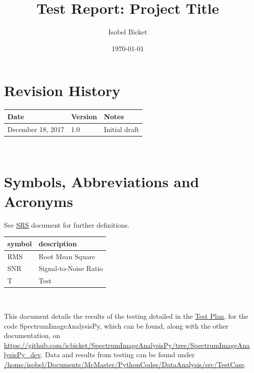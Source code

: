 \documentclass[12pt, titlepage]{article}
\newcommand{\progname}{SpectrumImageAnalysisPy}
\begin{document}
\title{Test Report: Project Title} 
\author{Isobel Bicket}
\date{\today}
	
\maketitle


\section{Revision History}

\begin{tabularx}{\textwidth}{p{4cm}p{2cm}X}
\toprule {\bf Date} & {\bf Version} & {\bf Notes}\\
\midrule
December 18, 2017 & 1.0 & Initial draft\\
\bottomrule
\end{tabularx}

~\newpage

\section{Symbols, Abbreviations and Acronyms}
See \hyperref[Doc:SRS]{SRS} document for further definitions.\\

\renewcommand{\arraystretch}{1.2}
\begin{tabular}{l l} 
  \toprule		
  \textbf{symbol} & \textbf{description}\\
  \midrule 
  RMS & Root Mean Square\\
  SNR & Signal-to-Noise Ratio\\
  T & Test\\
  \bottomrule
\end{tabular}\\


\newpage

\tableofcontents

\listoftables %

\listoffigures %

\newpage


This document details the results of the testing detailed in the
\hyperref[Doc:TestPlan]{Test Plan}, for the code \progname, which can be found,
along with the other documentation, on
\url{https://github.com/icbicket/SpectrumImageAnalysisPy/tree/SpectrumImageAnalysisPy_dev}. 
Data and results from testing can be found under 
\url{/home/isobel/Documents/McMaster/PythonCodes/DataAnalysis/src/TestCase}.
\end{document}
